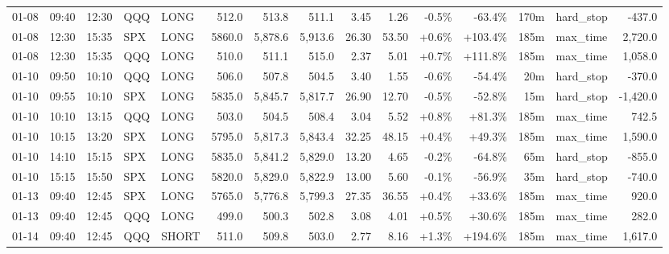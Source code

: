 \documentclass[11pt,a4paper,twoside]{article}
\begin{document}
\begin{landscape}
\begin{center}
\begin{longtable}{>{\color{txtmain}}l l l l l r r r r r r r r >{\color{txtmain}}l r}
01-08 & 09:40 & 12:30 & QQQ & LONG & 512.0 & 513.8 & 511.1 & 3.45 & 1.26 & \textcolor{lossred}{-0.5\%} & \textcolor{lossred}{-63.4\%} & 170m & hard\_stop & \textcolor{lossred}{-437.0} \\
01-08 & 12:30 & 15:35 & SPX & LONG & 5860.0 & 5,878.6 & 5,913.6 & 26.30 & 53.50 & \textcolor{wingreen}{+0.6\%} & \textcolor{wingreen}{+103.4\%} & 185m & max\_time & \textcolor{wingreen}{2,720.0} \\
01-08 & 12:30 & 15:35 & QQQ & LONG & 510.0 & 511.1 & 515.0 & 2.37 & 5.01 & \textcolor{wingreen}{+0.7\%} & \textcolor{wingreen}{+111.8\%} & 185m & max\_time & \textcolor{wingreen}{1,058.0} \\
01-10 & 09:50 & 10:10 & QQQ & LONG & 506.0 & 507.8 & 504.5 & 3.40 & 1.55 & \textcolor{lossred}{-0.6\%} & \textcolor{lossred}{-54.4\%} & 20m & hard\_stop & \textcolor{lossred}{-370.0} \\
01-10 & 09:55 & 10:10 & SPX & LONG & 5835.0 & 5,845.7 & 5,817.7 & 26.90 & 12.70 & \textcolor{lossred}{-0.5\%} & \textcolor{lossred}{-52.8\%} & 15m & hard\_stop & \textcolor{lossred}{-1,420.0} \\
01-10 & 10:10 & 13:15 & QQQ & LONG & 503.0 & 504.5 & 508.4 & 3.04 & 5.52 & \textcolor{wingreen}{+0.8\%} & \textcolor{wingreen}{+81.3\%} & 185m & max\_time & \textcolor{wingreen}{742.5} \\
01-10 & 10:15 & 13:20 & SPX & LONG & 5795.0 & 5,817.3 & 5,843.4 & 32.25 & 48.15 & \textcolor{wingreen}{+0.4\%} & \textcolor{wingreen}{+49.3\%} & 185m & max\_time & \textcolor{wingreen}{1,590.0} \\
01-10 & 14:10 & 15:15 & SPX & LONG & 5835.0 & 5,841.2 & 5,829.0 & 13.20 & 4.65 & \textcolor{lossred}{-0.2\%} & \textcolor{lossred}{-64.8\%} & 65m & hard\_stop & \textcolor{lossred}{-855.0} \\
01-10 & 15:15 & 15:50 & SPX & LONG & 5820.0 & 5,829.0 & 5,822.9 & 13.00 & 5.60 & \textcolor{lossred}{-0.1\%} & \textcolor{lossred}{-56.9\%} & 35m & hard\_stop & \textcolor{lossred}{-740.0} \\
01-13 & 09:40 & 12:45 & SPX & LONG & 5765.0 & 5,776.8 & 5,799.3 & 27.35 & 36.55 & \textcolor{wingreen}{+0.4\%} & \textcolor{wingreen}{+33.6\%} & 185m & max\_time & \textcolor{wingreen}{920.0} \\
01-13 & 09:40 & 12:45 & QQQ & LONG & 499.0 & 500.3 & 502.8 & 3.08 & 4.01 & \textcolor{wingreen}{+0.5\%} & \textcolor{wingreen}{+30.6\%} & 185m & max\_time & \textcolor{wingreen}{282.0} \\
01-14 & 09:40 & 12:45 & QQQ & SHORT & 511.0 & 509.8 & 503.0 & 2.77 & 8.16 & \textcolor{wingreen}{+1.3\%} & \textcolor{wingreen}{+194.6\%} & 185m & max\_time & \textcolor{wingreen}{1,617.0} \\

\end{longtable}
\end{center}
\end{landscape}
\end{document}
